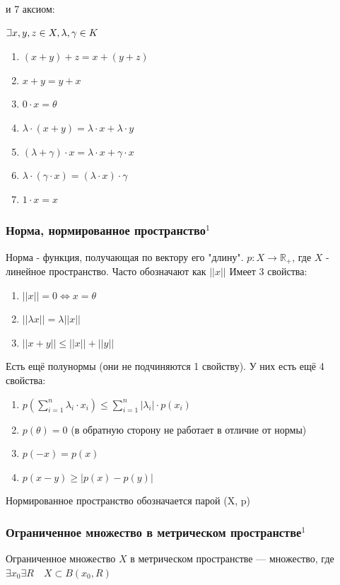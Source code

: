 \documentclass{article}
\def\letus{%
\mathord{\setbox0=\hbox{$\exists$}%
         \hbox{\kern 0.125\wd0%
               \vbox to \ht0{%
                  \hrule width 0.75\wd0%
                  \vfill%
                  \hrule width 0.75\wd0}%
               \vrule height \ht0%
               \kern 0.125\wd0}%
       }%
        }
\begin{document}
и 7 аксиом:

$\letus x, y, z \in X, \lambda, \gamma \in K$
\begin{enumerate}
    \item $(x + y) + z = x + (y + z)$
    \item $x + y = y + x$
    \item $0 \cdot x = \theta$
    \item $\lambda \cdot (x + y) = \lambda \cdot x + \lambda \cdot y$
    \item $(\lambda + \gamma) \cdot x = \lambda \cdot x + \gamma \cdot x$
    \item $\lambda \cdot (\gamma \cdot x) = (\lambda \cdot x) \cdot \gamma$
    \item $1 \cdot x = x$
\end{enumerate}

\subsubsection{Норма, нормированное пространство\texorpdfstring{$^1$}{}}
Норма - функция, получающая по вектору его "длину". $p: X \rightarrow \mathbb{R}_+$, где $X$ - линейное пространство. Часто обозначают как $||x||$ Имеет 3 свойства:
\begin{enumerate}
    \item $||x|| = 0 \Leftrightarrow x = \theta$
    \item $||\lambda x|| = \lambda ||x||$
    \item $||x + y|| \le ||x|| + ||y||$
\end{enumerate}

Есть ещё полунормы (они не подчиняются 1 свойству). У них есть ещё 4 свойства:
\begin{enumerate}
    \item $p(\sum\limits_{i=1}^n \lambda_i \cdot x_i) \le \sum\limits_{i=1}^n |\lambda_i| \cdot p(x_i)$
    \item $p(\theta) = 0$ (в обратную сторону не работает в отличие от нормы)
    \item $p(-x) = p(x)$
    \item $p(x-y) \ge |p(x) - p(y)|$
\end{enumerate}

Нормированное пространство обозначается парой (X, p)

\subsubsection{Ограниченное множество в метрическом пространстве\texorpdfstring{$^1$}{}}
Ограниченное множество $X$ в метрическом пространстве --- множество, где $\exists x_0 \exists R \quad X \subset B(x_0, R)$
\end{document}
